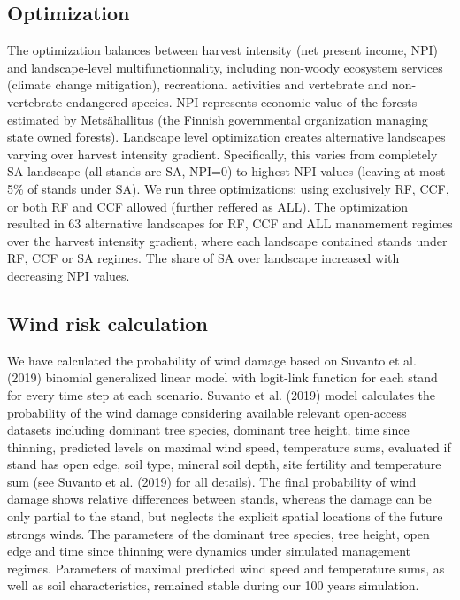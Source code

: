 \documentclass[]{elsarticle} %
\begin{document}
\hypertarget{optimization}{%
\subsection{Optimization}\label{optimization}}

The optimization balances between harvest intensity (net present income, NPI) and landscape-level multifunctionnality, including non-woody ecosystem services (climate change mitigation), recreational activities and vertebrate and non-vertebrate endangered species. NPI represents economic value of the forests estimated by Metsähallitus (the Finnish governmental organization managing state owned forests). Landscape level optimization creates alternative landscapes varying over harvest intensity gradient. Specifically, this varies from completely SA landscape (all stands are SA, NPI=0) to highest NPI values (leaving at most 5\% of stands under SA). We run three optimizations: using exclusively RF, CCF, or both RF and CCF allowed (further reffered as ALL).
The optimization resulted in 63 alternative landscapes for RF, CCF and ALL manamement regimes over the harvest intensity gradient, where each landscape contained stands under RF, CCF or SA regimes. The share of SA over landscape increased with decreasing NPI values.

\hypertarget{wind-risk-calculation}{%
\subsection{Wind risk calculation}\label{wind-risk-calculation}}

We have calculated the probability of wind damage based on Suvanto et al. (2019) binomial generalized linear model with logit-link function for each stand for every time step at each scenario. Suvanto et al. (2019) model calculates the probability of the wind damage considering available relevant open-access datasets including dominant tree species, dominant tree height, time since thinning, predicted levels on maximal wind speed, temperature sums, evaluated if stand has open edge, soil type, mineral soil depth, site fertility and temperature sum (see Suvanto et al. (2019) for all details). The final probability of wind damage shows relative differences between stands, whereas the damage can be only partial to the stand, but neglects the explicit spatial locations of the future strongs winds. The parameters of the dominant tree species, tree height, open edge and time since thinning were dynamics under simulated management regimes. Parameters of maximal predicted wind speed and temperature sums, as well as soil characteristics, remained stable during our 100 years simulation.
\end{document}
